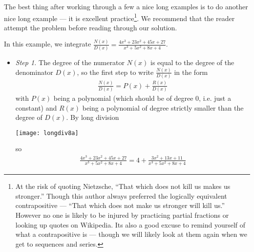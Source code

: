 The best thing after working through a few a nice long examples is to do another nice
long example --- it is excellent practice\footnote{At the risk of quoting Nietzsche,
``That which does not kill us makes us stronger.'' Though this author always preferred
the logically equivalent contrapositive --- ``That which does not make us stronger will
kill us.'' However no one is likely to be injured by practicing partial fractions or
looking up quotes on Wikipedia. Its also a good excuse to remind yourself of what a
contrapositive is --- though we will likely look at them again when we get to
sequences and series.}. We recommend that the reader attempt the problem before reading
through our solution.
\begin{eg}
                                                           \label{eg:PFdd}

\noindent
In this example, we integrate $\frac{N(x)}{D(x)}=
\frac{4x^3+23x^2+45x+27}{x^3+5x^2+8x+4}$.

\begin{itemize}
 \item \emph{Step 1.}
The degree of the numerator $N(x)$ is equal to the degree of the denominator $D(x)$, so
the first step  to write $\frac{N(x)}{D(x)}$ in the form
\begin{align*}
\frac{N(x)}{D(x)}=P(x)+\frac{R(x)}{D(x)}
\end{align*}
with $P(x)$ being a polynomial (which should be of degree $0$,
i.e. just a constant) and $R(x)$ being a polynomial of degree
strictly smaller than the degree of $D(x)$. By long division
\begin{center}
\texttt{[image: longdiv8a]}
\end{center}
so
\begin{align*}
\frac{4x^3+23x^2+45x+27}{x^3+5x^2+8x+4}
=4+\frac{3x^2+13x+11}{x^3+5x^2+8x+4}
\end{align*}


\end{itemize}
\end{eg}
